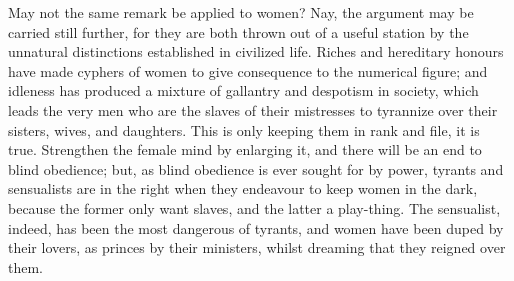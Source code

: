 May not the same remark be applied to women? Nay, the argument may be
carried still further, for they are both thrown out of a useful
station by the unnatural distinctions established in civilized life.
Riches and hereditary honours have made cyphers of women to give
consequence to the numerical figure; and idleness has produced a
mixture of gallantry and despotism in society, which leads the very
men who are the slaves of their mistresses to tyrannize over their
sisters, wives, and daughters. This is only keeping them in rank and
file, it is true. Strengthen the female mind by enlarging it, and
there will be an end to blind obedience; but, as blind obedience is
ever  sought for by power, tyrants and sensualists are in the
right when they endeavour to keep women in the dark, because the
former only want slaves, and the latter a play-thing. The
sensualist, indeed, has been the most dangerous of tyrants, and women
have been duped by their lovers, as princes by their ministers, whilst
dreaming that they reigned over them.

